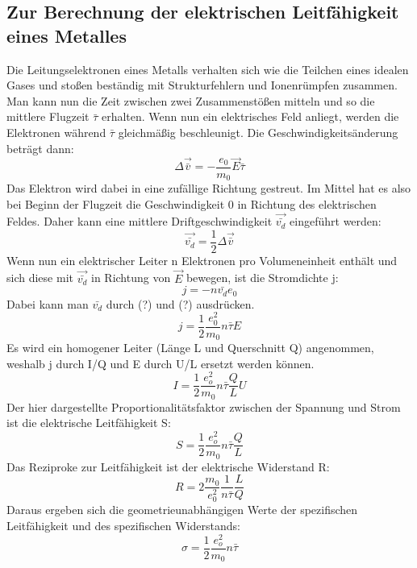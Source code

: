 \documentclass[titlepage=firstcover, captions=tableheading]{scrartcl}
\begin{document}
\subsection{Zur Berechnung der elektrischen Leitfähigkeit eines Metalles}
Die Leitungselektronen eines Metalls verhalten sich wie die Teilchen eines idealen Gases und stoßen beständig mit Strukturfehlern und Ionenrümpfen zusammen. Man kann nun die Zeit zwischen zwei Zusammenstößen mitteln und so die mittlere Flugzeit $\bar{\tau}$ erhalten. Wenn nun ein elektrisches Feld anliegt, werden die Elektronen während $\bar{\tau}$ gleichmäßig beschleunigt. Die Geschwindigkeitsänderung beträgt dann:
\begin{equation}
   \Delta \vec{\bar{v}}=-\frac{e_0}{m_0}\vec{E}\bar{\tau}
\end{equation}
Das Elektron wird dabei in eine zufällige Richtung gestreut. Im Mittel hat es also bei Beginn der Flugzeit die Geschwindigkeit 0 in Richtung des elektrischen Feldes. Daher kann eine mittlere Driftgeschwindigkeit $\vec{\bar{v_d}}$ eingeführt werden:
\begin{equation}
    \vec{\bar{v_d}}=\frac{1}{2}\Delta\vec{\bar{v}}
\end{equation}
Wenn nun ein elektrischer Leiter n Elektronen pro Volumeneinheit enthält und sich diese mit $\vec{\bar{v_d}}$ in Richtung von $\vec{E}$ bewegen, ist die Stromdichte j:
\begin{equation}
    j=-n\bar{v_d}e_0
\end{equation}
Dabei kann man $\bar{v_d}$ durch (?) und (?) ausdrücken.
\begin{equation}
    j=\frac{1}{2}\frac{e_0^2}{m_0}n\bar{\tau}E
\end{equation}
Es wird ein homogener Leiter (Länge L und Querschnitt Q) angenommen, weshalb j durch I/Q und E durch U/L ersetzt werden können.
\begin{equation}
    I=\frac{1}{2}\frac{e_o^2}{m_0}n\bar{\tau}\frac{Q}{L}U
\end{equation}
Der hier dargestellte Proportionalitätsfaktor zwischen der Spannung und Strom ist die elektrische Leitfähigkeit S:
\begin{equation}
    S=\frac{1}{2}\frac{e_o^2}{m_0}n\bar{\tau}\frac{Q}{L}
\end{equation}
Das Reziproke zur Leitfähigkeit ist der elektrische Widerstand R:
\begin{equation}
    R=2\frac{m_0}{e_0^2}\frac{1}{n\bar{\tau}}\frac{L}{Q}
\end{equation}
Daraus ergeben sich die geometrieunabhängigen Werte der spezifischen Leitfähigkeit \sigma und des spezifischen Widerstands\rho:
\begin{equation}
    \sigma=\frac{1}{2}\frac{e_o^2}{m_0}n\bar{\tau}
\end{equation}
\end{document}
